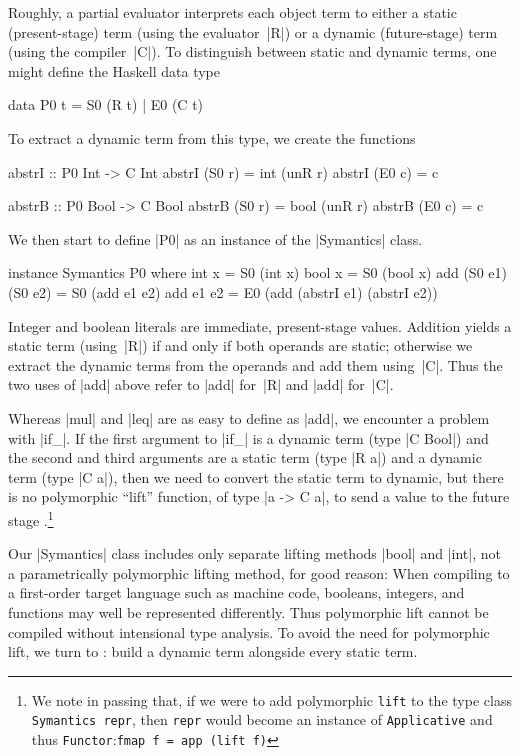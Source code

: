 Roughly, a partial evaluator interprets each object term to either
a static (present-stage) term (using the evaluator~|R|) or
a dynamic (future-stage) term (using the compiler~|C|).  To
distinguish between static and dynamic terms, one might define
the Haskell data type
\begin{code}
data P0 t = S0 (R t) | E0 (C t)
\end{code}
To extract a dynamic term from this type, we create the functions
\begin{code}
abstrI :: P0 Int -> C Int
abstrI (S0 r) = int (unR r)
abstrI (E0 c) = c

abstrB :: P0 Bool -> C Bool
abstrB (S0 r) = bool (unR r)
abstrB (E0 c) = c
\end{code}
We then start to define |P0| as an instance of the |Symantics| class.
\begin{code}
instance Symantics P0 where
  int  x = S0 (int x)
  bool x = S0 (bool x)
  add (S0 e1) (S0 e2) = S0 (add e1 e2)
  add e1 e2 = E0 (add (abstrI e1) (abstrI e2))
\end{code}
Integer and boolean literals are immediate, present-stage
values. Addition yields a static term (using~|R|) if and only if both operands
are static; otherwise we extract the dynamic terms from the operands and
add them using~|C|.  Thus the two uses of |add| above refer to
|add| for~|R| and |add| for~|C|.

Whereas |mul| and |leq| are as easy to define as |add|, we encounter
a problem with |if_|.  If the first argument to |if_| is a dynamic term
(type |C Bool|) and the second and third arguments are a static term
(type |R a|) and a dynamic term (type |C a|), then we need to convert
the static term to dynamic, but there is no polymorphic ``lift''
function, of type |a -> C a|, to send a value to the future stage
\cite{xi-guarded,WalidPOPL03}.\footnote{We note in passing that, if we
were to add polymorphic \texttt{lift} to the type class
\texttt{Symantics repr}, then \texttt{repr} would become an instance of
\texttt{Applicative} and thus \texttt{Functor}:\quad\texttt{fmap
f = app (lift f)}}

Our |Symantics| class includes only separate lifting methods |bool| and
|int|, not a parametrically polymorphic lifting method, for good reason:
When compiling to a first-order target language such as machine code,
booleans, integers, and functions may well be represented differently.
Thus polymorphic lift cannot be compiled without intensional type
analysis.  To avoid the need for polymorphic lift, we turn to
\citet[see also \citealp{sumii-hybrid}]{asai-binding-time}:
build a dynamic term
alongside every static term.

